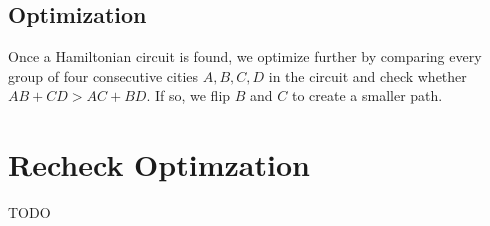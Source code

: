 \documentclass[letterpaper,11pt]{article}
\begin{document}

		\subsection{Optimization}
			Once a Hamiltonian circuit is found, we optimize further by
			comparing every group of four consecutive cities $A, B, C, D$ in
			the circuit and check whether $AB+CD > AC+BD$. If so, we flip $B$
			and $C$ to create a smaller path.


	\section{Recheck Optimzation}
		TODO

\end{document}
